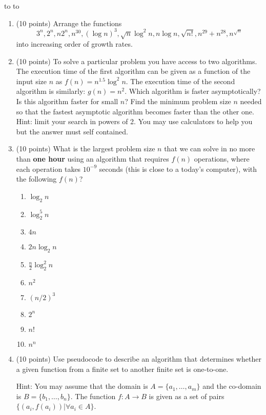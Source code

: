 \documentclass[10pt]{article}
\newcommand{\handout}{
   \renewcommand{\thepage}{H\hnumber-\arabic{page}}
   \noindent
   \begin{center}
      \vbox{
    \hbox to \columnwidth {\sc{\course} --- \prof \hfill}
    \vspace{-2mm}
    \hbox to \columnwidth {\sc due \MakeLowercase{\duedate} \duelocation\hfill {\Huge\color{mdb}H\hnumber.}}
	\vspace{15pt}
	{\Huge\yourname}
      }
   \end{center}
   \vspace*{2mm}
}
\begin{document}
\thispagestyle{empty}
\handout

\begin{enumerate}

\item (10 points) Arrange the functions 
$$3^n, 2^n, n 2^n,  n^{30}, (\log n)^3, \sqrt{n}\log^2 n, n\log n, \sqrt{n!}, n^{29}+n^{28}, n^{\sqrt{n}}$$
into increasing order of growth rates.

\item (10 points) 
To solve a particular problem you have access to two algorithms. 
The execution time of the first algorithm can be given as a function of the
input size $n$ as $f(n) = n^{1.5} \log^2 n$.
The execution time of the second algorithm is similarly: $g(n) = n^2$.
Which algorithm is faster asymptotically?
Is this algorithm faster for small $n$?
Find the minimum problem size $n$ needed so that the fastest asymptotic 
algorithm becomes faster than the other one.
Hint: limit your search in powers of 2. You may use calculators to help you
but the answer must self contained.

\item (10 points) 
What is the largest problem size $n$ that we can solve in no more than 
{\bf  one hour} using an algorithm that requires $f(n)$ operations, 
where each operation takes $10^{-9}$ seconds (this is close to a today's computer), 
with the following $f(n)$?
\begin{enumerate}
\item $\log_2 n$
\item $\log^5_2 n$
\item $4n$
\item $2n\log_2 n$
\item $\frac{n}{2}\log^2_2 n$
\item $n^2$
\item $(n/2)^3$
\item $2^n$
\item $n!$
\item $n^n$
\end{enumerate}

\item (10 points) Use pseudocode to describe an algorithm that determines whether a given function from a finite set to another finite set is one-to-one.

Hint: You may assume that the domain is $A=\{a_1,\ldots,a_m\}$ and the co-domain is $B=\{b_1,\ldots,b_n\}$. The function $f: A\rightarrow B$ is given as a set of pairs $\{(a_i,f(a_i))|\forall a_i\in A\}$.

\end{enumerate}
\end{document}

